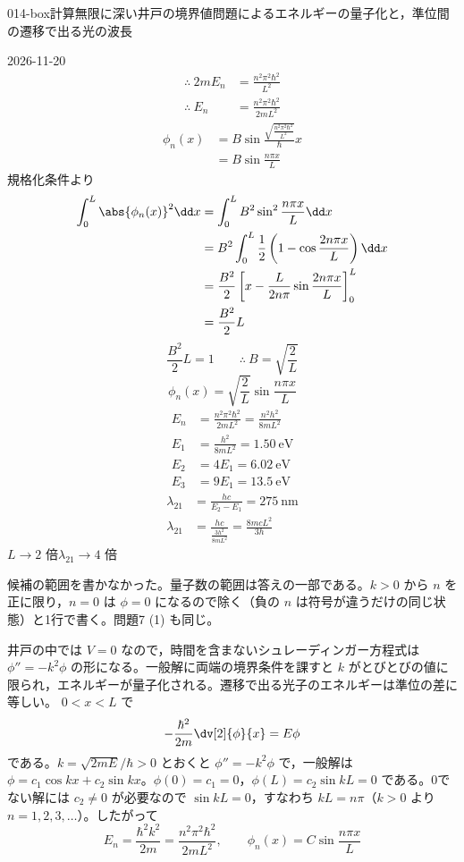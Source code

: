 \documentclass[uplatex,dvipdfmx,a4paper,11pt]{jsarticle}
\begin{document}
\begin{mondai}{014-box}{計算}{無限に深い井戸の境界値問題によるエネルギーの量子化と，準位間の遷移で出る光の波長}
\begin{kotaeutsushi}{2026-11-20}
\begin{align*}
\therefore\ 2mE_{n}&=\frac{n^{2}\pi^{2}\hbar^{2}}{L^{2}}\\
\therefore\ E_{n}&=\frac{n^{2}\pi^{2}\hbar^{2}}{2mL^{2}}
\end{align*}
\begin{align*}
\phi_{n}(x)&=B\sin\frac{\sqrt{\frac{n^{2}\pi^{2}\hbar^{2}}{L^{2}}}}{\hbar}x\\
&=B\sin\frac{n\pi x}{L}
\end{align*}
規格化条件より
\begin{align*}
\int_{0}^{L}\abs{\phi_{n}(x)}^{2}\dd x&=\int_{0}^{L}B^{2}\sin^{2}\frac{n\pi x}{L}\dd x\\
&=B^{2}\int_{0}^{L}\frac{1}{2}\left(1-\cos\frac{2n\pi x}{L}\right)\dd x\\
&=\frac{B^{2}}{2}\left[x-\frac{L}{2n\pi}\sin\frac{2n\pi x}{L}\right]_{0}^{L}\\
&=\frac{B^{2}}{2}L
\end{align*}
\[ \frac{B^{2}}{2}L=1\qquad\therefore\ B=\sqrt{\frac{2}{L}} \]
\[ \phi_{n}(x)=\sqrt{\frac{2}{L}}\sin\frac{n\pi x}{L} \]
\begin{align*}
E_{n}&=\frac{n^{2}\pi^{2}\hbar^{2}}{2mL^{2}}=\frac{n^{2}h^{2}}{8mL^{2}}\\
E_{1}&=\frac{h^{2}}{8mL^{2}}=\qty{1.50}{\electronvolt}\\
E_{2}&=4E_{1}=\qty{6.02}{\electronvolt}\\
E_{3}&=9E_{1}=\qty{13.5}{\electronvolt}
\end{align*}
\begin{align*}
\lambda_{21}&=\frac{hc}{E_{2}-E_{1}}=\qty{275}{\nano\metre}\\
\lambda_{21}&=\frac{hc}{\frac{3h^{2}}{8mL^{2}}}=\frac{8mcL^{2}}{3h}
\end{align*}
$L\to2$ 倍\qquad $\lambda_{21}\to4$ 倍
\end{kotaeutsushi}
\begin{kizuki}
\item {} 候補の範囲を書かなかった。量子数の範囲は答えの一部である。$k>0$ から $n$ を正に限り，$n=0$ は $\phi=0$ になるので除く（負の $n$ は符号が違うだけの同じ状態）と1行で書く。問題7 (1) も同じ。
\end{kizuki}
\begin{tadashii}
\houshin 井戸の中では $V=0$ なので，時間を含まないシュレーディンガー方程式は $\phi''=-k^{2}\phi$ の形になる。一般解に両端の境界条件を課すと $k$ がとびとびの値に限られ，エネルギーが量子化される。遷移で出る光子のエネルギーは準位の差に等しい。
\keisan
{} $0<x<L$ で
\[ -\frac{\hbar^{2}}{2m}\dv[2]{\phi}{x}=E\phi \]
である。$k=\sqrt{2mE}/\hbar>0$ とおくと $\phi''=-k^{2}\phi$ で，一般解は $\phi=c_{1}\cos kx+c_{2}\sin kx$。$\phi(0)=c_{1}=0$，$\phi(L)=c_{2}\sin kL=0$ である。0でない解には $c_{2}\neq0$ が必要なので $\sin kL=0$，すなわち $kL=n\pi$（$k>0$ より $n=1,2,3,\dots$）。したがって
\[ E_{n}=\frac{\hbar^{2}k^{2}}{2m}=\frac{n^{2}\pi^{2}\hbar^{2}}{2mL^{2}},\qquad \phi_{n}(x)=C\sin\frac{n\pi x}{L} \]


\end{tadashii}
\end{mondai}
\end{document}
